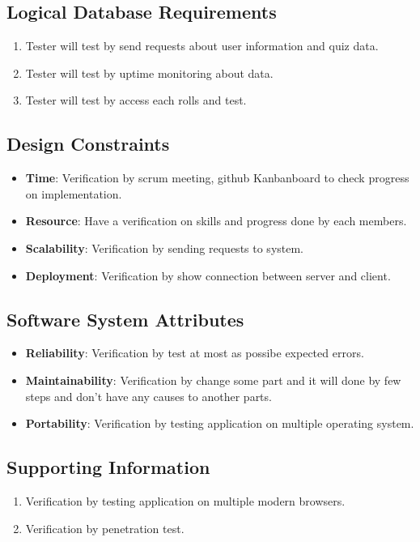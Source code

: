 \documentclass[ 10pt]{report}
\begin{document}
        \subsection{Logical Database Requirements}
        \begin{enumerate}
            \item Tester will test by send requests about user information and quiz data.
            \item Tester will test by uptime monitoring about data.
            \item Tester will test by access each rolls and test.
        \end{enumerate}
        \subsection{Design Constraints}
        \begin{itemize}
            \item \textbf{Time}: Verification by scrum meeting, github Kanbanboard to check progress on implementation.
            \item \textbf{Resource}: Have a verification on skills and progress done by each members.
            \item \textbf{Scalability}: Verification by sending requests to system.
            \item \textbf{Deployment}: Verification by show connection between server and client.
        \end{itemize}
        \subsection{Software System Attributes}
        \begin{itemize}
            \item \textbf{Reliability}: Verification by test at most as possibe expected errors.
            \item \textbf{Maintainability}: Verification by change some part and it will done by few steps and don't have any causes to another parts.
            \item \textbf{Portability}: Verification by testing application on multiple operating system.
        \end{itemize}
        \subsection{Supporting Information}
        \begin{enumerate}
            \item Verification by testing application on multiple modern browsers.
            \item Verification by penetration test.
        \end{enumerate}
    \pagebreak
\end{document}
